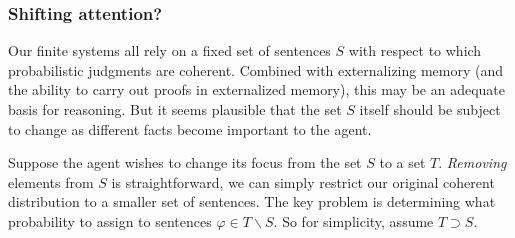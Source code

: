 \documentclass[12pt]{article}
\theoremstyle{definition}
\newcommand{\of}[1]{\left(#1\right)}
\newcommand{\vp}{\varphi}
\begin{document}
%

\subsubsection{Shifting attention?}

Our finite systems all rely on a fixed set of sentences $S$
with respect to which probabilistic judgments are coherent.
Combined with externalizing memory
(and the ability to carry out proofs in externalized memory), this may be an adequate
basis for reasoning.
But it seems plausible that the set $S$ itself should
be subject to change as different facts become important to the agent.

Suppose the agent wishes to change its focus from the set $S$ to a set $T$.
\emph{Removing} elements from $S$ is straightforward, we can simply
restrict our original coherent distribution to a smaller set of sentences.
The key problem is determining what probability to assign to sentences
$\vp \in T \backslash S$.
So for simplicity, assume $T \supset S$.
\end{document}
